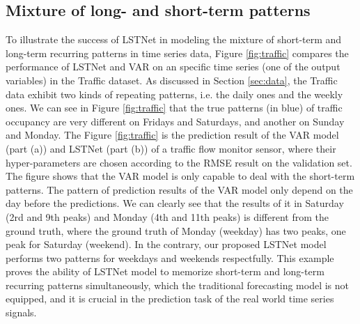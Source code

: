 \documentclass[sigconf]{acmart}
\def\traffic{{\sf Traffic}\xspace}
\begin{document}
\subsection{Mixture of long- and short-term patterns}
\label{sec:mixture}
To illustrate the success of LSTNet in modeling the mixture of short-term and long-term recurring patterns in time series data, Figure \ref{fig:traffic} compares the performance of LSTNet and VAR on an specific time series (one of the output variables) in the \traffic dataset.  As discussed in Section 
\ref{sec:data}, the \traffic data exhibit two kinds of repeating patterns, i.e. the daily ones and the weekly ones. We can see in Figure \ref{fig:traffic} that the true patterns (in blue) of traffic occupancy are very different on Fridays and Saturdays, and another on Sunday and Monday.
The Figure \ref{fig:traffic} is the prediction result of the VAR model (part (a)) and LSTNet (part (b)) of a traffic flow monitor sensor, where their hyper-parameters are chosen according to the RMSE result on the validation set. The figure shows that the VAR model is only capable to deal with the short-term patterns. The pattern of prediction results of the VAR model only depend on the day before the predictions. We can clearly see that the results of it in Saturday (2rd and 9th peaks) and Monday (4th and 11th peaks) is different from the ground truth, where the ground truth of Monday (weekday) has two peaks, one peak for Saturday (weekend). In the contrary, our proposed LSTNet model performs two patterns for weekdays and weekends respectfully. This example proves the ability of LSTNet model to memorize short-term and long-term recurring patterns simultaneously, which the traditional forecasting model is not equipped, and it is crucial in the prediction task of the real world time series signals. 
\end{document}
